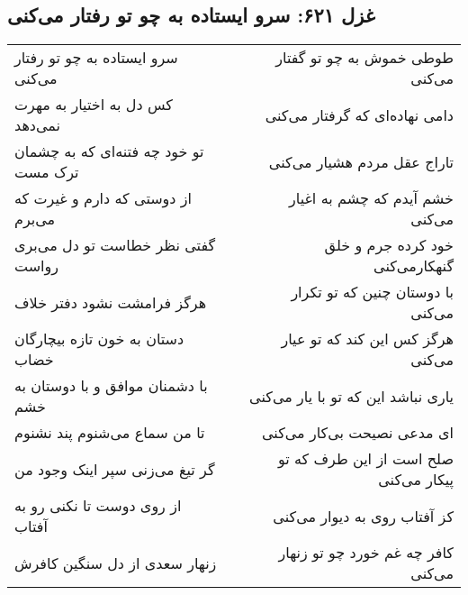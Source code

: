 \begin{center}
\section*{غزل ۶۲۱: سرو ایستاده به چو تو رفتار می‌کنی}
\label{sec:621}
\begin{longtable}{l p{0.5cm} r}
سرو ایستاده به چو تو رفتار می‌کنی
&&
طوطی خموش به چو تو گفتار می‌کنی
\\
کس دل به اختیار به مهرت نمی‌دهد
&&
دامی نهاده‌ای که گرفتار می‌کنی
\\
تو خود چه فتنه‌ای که به چشمان ترک مست
&&
تاراج عقل مردم هشیار می‌کنی
\\
از دوستی که دارم و غیرت که می‌برم
&&
خشم آیدم که چشم به اغیار می‌کنی
\\
گفتی نظر خطاست تو دل می‌بری رواست
&&
خود کرده جرم و خلق گنهکارمی‌کنی
\\
هرگز فرامشت نشود دفتر خلاف
&&
با دوستان چنین که تو تکرار می‌کنی
\\
دستان به خون تازه بیچارگان خضاب
&&
هرگز کس این کند که تو عیار می‌کنی
\\
با دشمنان موافق و با دوستان به خشم
&&
یاری نباشد این که تو با یار می‌کنی
\\
تا من سماع می‌شنوم پند نشنوم
&&
ای مدعی نصیحت بی‌کار می‌کنی
\\
گر تیغ می‌زنی سپر اینک وجود من
&&
صلح است از این طرف که تو پیکار می‌کنی
\\
از روی دوست تا نکنی رو به آفتاب
&&
کز آفتاب روی به دیوار می‌کنی
\\
زنهار سعدی از دل سنگین کافرش
&&
کافر چه غم خورد چو تو زنهار می‌کنی
\\
\end{longtable}
\end{center}
